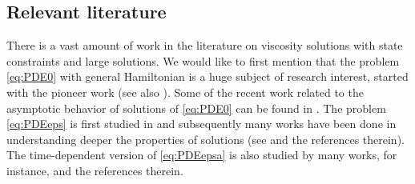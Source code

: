 \documentclass[12pt,reqno]{amsart}
\numberwithin{figure}{section}
\theoremstyle{plain}
\theoremstyle{remark}
\numberwithin{equation}{section}
\begin{document}

\subsection{Relevant literature} There is a
vast amount of work in the literature on viscosity solutions with state constraints and large solutions. We would like to first mention that the problem \eqref{eq:PDE0} with general Hamiltonian is a huge subject of research interest, started with the pioneer work \cite{Soner1986} (see also \cite{ishii_new_1996,ishii_class_2002}).  Some of the recent work related to the asymptotic behavior of solutions of \eqref{eq:PDE0} can be found in \cite{ishii_vanishing_2017,kim_state-constraint_2020,mitake_asymptotic_2008,tu2021vanishing}. The problem \eqref{eq:PDEeps} is first studied in \cite{Lasry1989} and subsequently many works have been done in understanding deeper the properties of solutions (see \cite{ Porretta_a,alessio_asymptotic_2006,Bandle_1994, marcus_existence_2003} and the references therein). The time-dependent version of \eqref{eq:PDEepsa} is also studied by many works, for instance, \cite{barles_generalized_2004,barles_large_2010,leonori_local_2011,moll_large_2012} and the references therein. %
\end{document}
